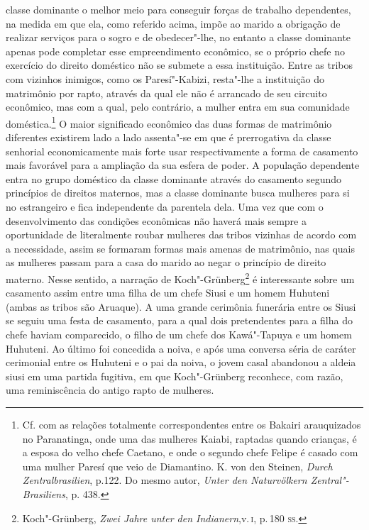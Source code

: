classe dominante o melhor meio para conseguir forças de trabalho
dependentes, na medida em que ela, como referido acima, impõe ao marido
a obrigação de realizar serviços para o sogro e de obedecer"-lhe, no
entanto a classe dominante apenas pode completar esse empreendimento
econômico, se o próprio chefe no exercício do direito doméstico não se
submete a essa instituição. Entre as tribos com vizinhos inimigos, como
os Paresí"-Kabizi, resta"-lhe a instituição do matrimônio por rapto,
através da qual ele não é arrancado de seu circuito econômico, mas com a
qual, pelo contrário, a mulher entra em sua comunidade
doméstica.\footnote{Cf. com as relações totalmente correspondentes entre
  os Bakairi arauquizados no Paranatinga, onde uma das mulheres Kaiabi,
  raptadas quando crianças, é a esposa do velho chefe Caetano, e onde o
  segundo chefe Felipe é casado com uma mulher Paresí que veio de
  Diamantino. K. von den Steinen, \textit{Durch Zentralbrasilien}, p.122.
  Do mesmo autor, \textit{Unter den Naturvölkern Zentral"-Brasiliens}, p.
  438.} O maior significado econômico das duas formas de matrimônio
diferentes existirem lado a lado assenta"-se em que é prerrogativa da
classe senhorial economicamente mais forte usar respectivamente a forma
de casamento mais favorável para a ampliação da sua esfera de poder. A
população dependente entra no grupo doméstico da classe dominante
através do casamento segundo princípios de direitos maternos, mas a
classe dominante busca mulheres para si no estrangeiro e fica
independente da parentela dela. Uma vez que com o desenvolvimento das
condições econômicas não haverá mais sempre a oportunidade de
literalmente roubar mulheres das tribos vizinhas de acordo com a
necessidade, assim se formaram formas mais amenas de matrimônio, nas
quais as mulheres passam para a casa do marido ao negar o princípio de
direito materno. Nesse sentido, a narração de Koch"-Grünberg\footnote{Koch"-Grünberg,
  \textit{Zwei Jahre unter den Indianern},v.\,\textsc{i}, p.\,180 \textsc{ss}.} é interessante
sobre um casamento assim entre uma filha de um chefe Siusi e um homem
Huhuteni (ambas as tribos são Aruaque). A uma grande cerimônia
funerária entre os Siusi se seguiu uma festa de casamento, para a qual
dois pretendentes para a filha do chefe haviam comparecido, o filho de
um chefe dos Kawá"-Tapuya e um homem Huhuteni. Ao último foi concedida a
noiva, e após uma conversa séria de caráter cerimonial entre os Huhuteni
e o pai da noiva, o jovem casal abandonou a aldeia siusi em uma partida
fugitiva, em que Koch"-Grünberg reconhece, com razão, uma reminiscência
do antigo rapto de mulheres.

